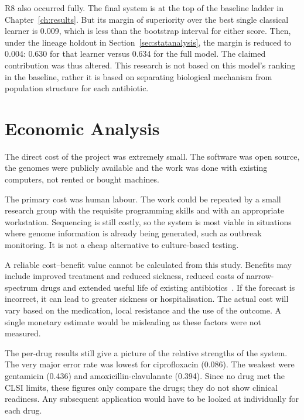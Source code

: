 R8 also occurred fully. The final system is at the top of the baseline ladder in
Chapter~\ref{ch:results}. But its margin of superiority over the best single classical learner
is 0.009, which is less than the bootstrap interval for either score. Then, under the lineage
holdout in Section~\ref{sec:statanalysis}, the margin is reduced to 0.004: 0.630 for that
learner versus 0.634 for the full model. The claimed contribution was thus altered. This research
is not based on this model's ranking in the baseline, rather it is based on separating
biological mechanism from population structure for each antibiotic.

\section{Economic Analysis}
\label{sec:economic}

The direct cost of the project was extremely small. The software was open source, the genomes
were publicly available and the work was done with existing computers, not rented or bought
machines.

The primary cost was human labour. The work could be repeated by a small research group with
the requisite programming skills and with an appropriate workstation. Sequencing is still
costly, so the system is most viable in situations where genome information is already being
generated, such as outbreak monitoring. It is not a cheap alternative to culture-based testing.

A reliable cost--benefit value cannot be calculated from this study. Benefits may include
improved treatment and reduced sickness, reduced costs of narrow-spectrum drugs and extended
useful life of existing antibiotics~\cite{who_amr_2019}. If the forecast is incorrect, it can
lead to greater sickness or hospitalisation. The actual cost will vary based on the medication,
local resistance and the use of the outcome. A single monetary estimate would be misleading as
these factors were not measured.

The per-drug results still give a picture of the relative strengths of the system. The very
major error rate was lowest for ciprofloxacin (0.086). The weakest were gentamicin (0.436) and
amoxicillin-clavulanate (0.394). Since no drug met the CLSI limits, these figures only compare
the drugs; they do not show clinical readiness. Any subsequent application would have to be
looked at individually for each drug.
